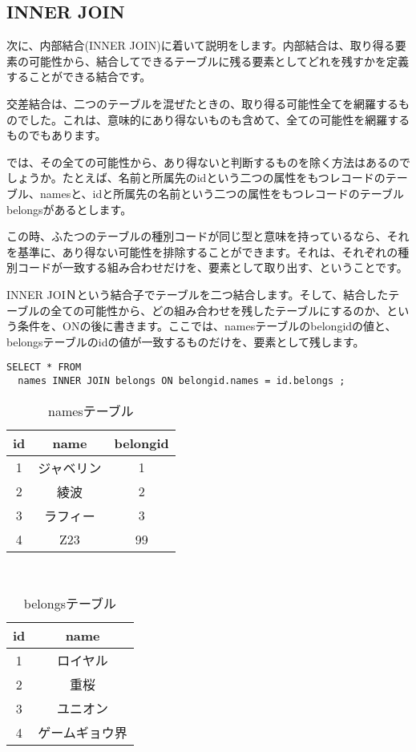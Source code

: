 \subsection{INNER JOIN}

次に、内部結合(INNER JOIN)に着いて説明をします。内部結合は、取り得る要素の可能性から、結合してできるテーブルに残る要素としてどれを残すかを定義することができる結合です。

交差結合は、二つのテーブルを混ぜたときの、取り得る可能性全てを網羅するものでした。これは、意味的にあり得ないものも含めて、全ての可能性を網羅するものでもあります。

では、その全ての可能性から、あり得ないと判断するものを除く方法はあるのでしょうか。たとえば、名前と所属先のidという二つの属性をもつレコードのテーブル、namesと、idと所属先の名前という二つの属性をもつレコードのテーブルbelongsがあるとします。

この時、ふたつのテーブルの種別コードが同じ型と意味を持っているなら、それを基準に、あり得ない可能性を排除することができます。それは、それぞれの種別コードが一致する組み合わせだけを、要素として取り出す、ということです。

INNER JOIＮという結合子でテーブルを二つ結合します。そして、結合したテーブルの全ての可能性から、どの組み合わせを残したテーブルにするのか、という条件を、ONの後に書きます。ここでは、namesテーブルのbelongidの値と、belongsテーブルのidの値が一致するものだけを、要素として残します。

\begin{verbatim}
SELECT * FROM
  names INNER JOIN belongs ON belongid.names = id.belongs ; 
\end{verbatim}

\begin{table}[htb]
  \begin{tabular}{|c|c|c|} \hline
    id & name & belongid \\ \hline
    1 & ジャベリン & 1 \\
    2 & 綾波 & 2 \\
    3 & ラフィー & 3 \\
    4 & Z23 & 99 \\ \hline
  \end{tabular}
　　\label{table:names_inner}
　　\caption{namesテーブル}
\end{table}

\begin{table}[htb]
  \begin{tabular}{|c|c|} \hline
    id & name \\ \hline
    1 & ロイヤル \\
    2 & 重桜 \\
    3 & ユニオン \\ 
    4 & ゲームギョウ界 \\ \hline
  \end{tabular}
　　\label{table:belongs_inner}
　　\caption{belongsテーブル}
\end{table}


